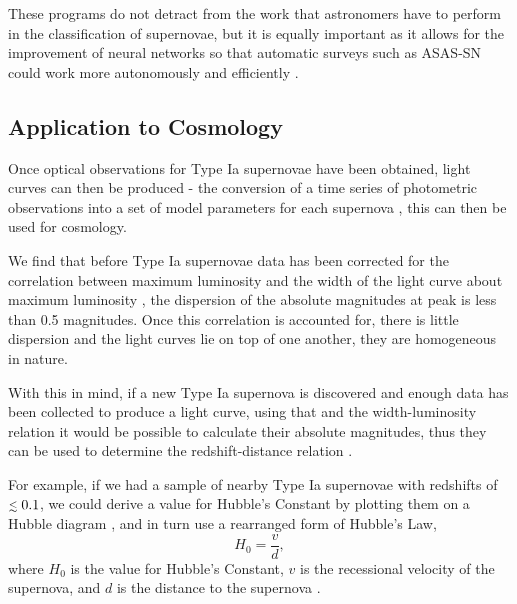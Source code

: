 \documentclass[twocolumn]{revtex4}
\begin{document}
These programs do not detract from the work that astronomers have to perform in the classification of supernovae, but it is equally important as it allows for the improvement of neural networks so that automatic surveys such as ASAS-SN could work more autonomously and efficiently \cite{cit-sci}.  


\vspace{-3ex}
\subsection{Application to Cosmology} \label{appcosmo}
\vspace{-2ex}
Once optical observations for Type Ia supernovae have been obtained, light curves can then be produced - the conversion of a time series of photometric observations into a set of model parameters for each supernova \cite{sn_consts}, this can then be used for cosmology. 

We find that before Type Ia supernovae data has been corrected for the correlation between maximum luminosity and the width of the light curve about maximum luminosity \cite{longair, abs_phil}, the dispersion of the absolute magnitudes at peak is less than 0.5 magnitudes. Once this correlation is accounted for, there is little dispersion and the light curves lie on top of one another, they are homogeneous in nature. 

With this in mind, if a new Type Ia supernova is discovered and enough data has been collected to produce a light curve, using that and the width-luminosity relation it would be possible to calculate their absolute magnitudes, thus they can be used to determine the redshift-distance relation \cite{mod_ast}.

For example, if we had a sample of nearby Type Ia supernovae with redshifts of $\mathrel{\mathsmaller{\lesssim}} 0.1$, we could derive a value for Hubble's Constant by plotting them on a Hubble diagram \cite{exp_uni_sn}, and in turn use a rearranged form of Hubble's Law,
\begin{equation}
H_0 = \frac{v}{d}, 
\label{h_nought}
\end{equation}
where $H_0$ is the value for Hubble's Constant, $v$ is the recessional velocity of the supernova, and $d$ is the distance to the supernova \cite{mod_ast}. 
\end{document}
